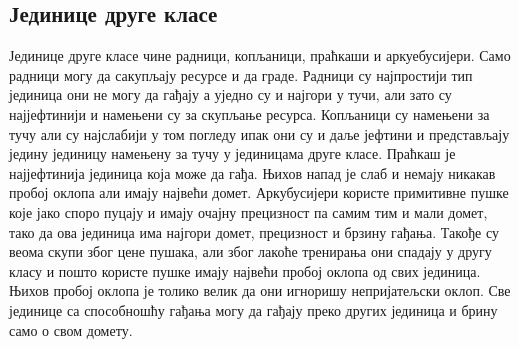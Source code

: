 \documentclass[11pt,a4paper]{article}
\begin{document}
\subsection{Јединице друге класе}
Јединице друге класе чине радници, копљаници, праћкаши и аркуебусијери. Само радници могу да сакупљају ресурсе и да граде. Радници су најпростији тип јединица они не могу да гађају а уједно су и најгори у тучи, али зато су најјефтинији и намењени су за скупљање ресурса. Копљаници су намењени за тучу али су најслабији у том погледу ипак они су и даље јефтини и представљају једину јединицу намењену за тучу у јединицама друге класе. Праћкаш је најјефтинија јединица која може да гађа. Њихов напад је слаб и немају никакав пробој оклопа али имају највећи домет. Аркубусијери користе примитивне пушке које јако споро пуцају и имају очајну прецизност па самим тим и мали домет, тако да ова јединица има најгори домет, прецизност и брзину гађања. Такође су веома скупи због цене пушака, али због лакоће тренирања они спадају у другу класу и пошто користе пушке имају највећи пробој оклопа од свих јединица. Њихов пробој оклопа је толико велик да они игноришу непријатељски оклоп. Све јединице са способношћу гађања могу да гађају преко других јединица и брину само о свом домету.
\end{document}

